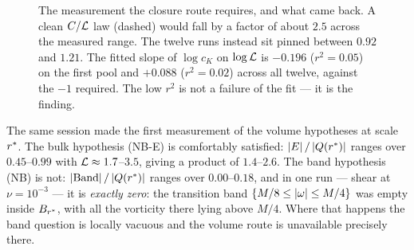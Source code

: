 \begin{figure}[ht]
\centering
{}
\caption[The \(\Lfac\)-decay test]{The measurement the closure route requires,
and what came back. A clean \(C/\mathcal{L}\) law (dashed) would fall by a factor of
about \(2.5\) across the measured range. The twelve runs instead sit pinned
between \(0.92\) and \(1.21\). The fitted slope of \(\log c_K\) on
\(\log\mathcal{L}\) is \(-0.196\) (\(r^2=0.05\)) on the first pool and \(+0.088\)
(\(r^2=0.02\)) across all twelve, against the \(-1\) required. The low
\(r^2\) is not a failure of the fit --- it is the finding.}
\label{fig:l-decay}
\end{figure}

The same session made the first measurement of the volume hypotheses at scale
\(r^{*}\). The bulk hypothesis (NB-E) is comfortably satisfied:
\(\left|E\right|/\left|Q(r^{*})\right|\) ranges over \(0.45\)--\(0.99\) with
\(\mathcal{L}\approx1.7\)--\(3.5\), giving a product of \(1.4\)--\(2.6\). The band
hypothesis (NB) is not: \(\left|\mathrm{Band}\right|/\left|Q(r^{*})\right|\) ranges over
\(0.00\)--\(0.18\), and in one run --- shear at \(\nu=10^{-3}\) --- it is
\emph{exactly zero}: the transition band \(\{M/8\le\left|\omega\right|\le M/4\}\) was
empty inside \(B_{r^{*}}\), with all the vorticity there lying above
\(M/4\). Where that happens the band question is locally vacuous and the
volume route is unavailable precisely there.

